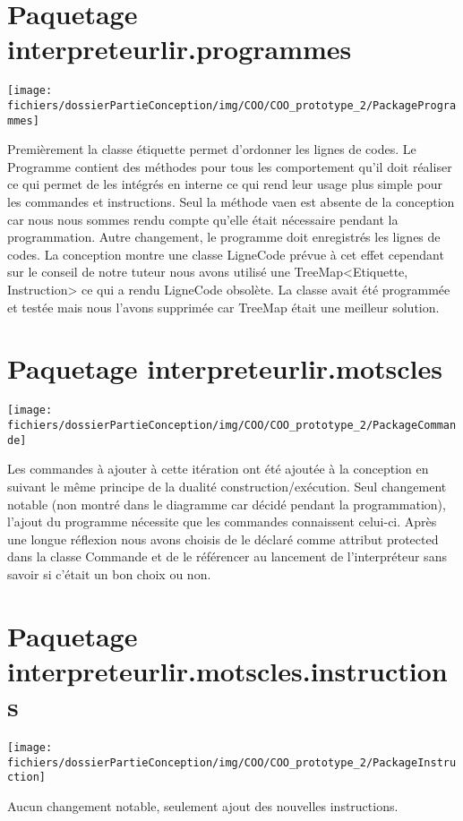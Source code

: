 \section{Paquetage interpreteurlir.programmes}
\begin{center}\texttt{[image: fichiers/dossierPartieConception/img/COO/COO\_prototype\_2/PackageProgrammes]}\end{center}
\par Premièrement la classe étiquette permet d'ordonner les lignes de codes. Le Programme contient des méthodes pour tous les comportement qu'il doit réaliser ce qui permet de les intégrés en interne ce qui rend leur usage plus simple pour les commandes et instructions. Seul la méthode vaen est absente de la conception car nous nous sommes rendu compte qu'elle était nécessaire pendant la programmation. Autre changement, le programme doit enregistrés les lignes de codes. La conception montre une classe LigneCode prévue à cet effet cependant sur le conseil de notre tuteur nous avons utilisé une TreeMap<Etiquette, Instruction> ce qui a rendu LigneCode obsolète. La classe avait été programmée et testée mais nous l'avons supprimée car TreeMap était une meilleur solution.

\section{Paquetage interpreteurlir.motscles}
\begin{center}\texttt{[image: fichiers/dossierPartieConception/img/COO/COO\_prototype\_2/PackageCommande]}\end{center}
\par Les commandes à ajouter à cette itération ont été ajoutée à la conception en suivant le même principe de la dualité construction/exécution. Seul changement notable (non montré dans le diagramme car décidé pendant la programmation), l'ajout du programme nécessite que les commandes connaissent celui-ci. Après une longue réflexion nous avons choisis de le déclaré comme attribut protected dans la classe Commande et de le référencer au lancement de l'interpréteur sans savoir si c'était un bon choix ou non.

\section{Paquetage interpreteurlir.motscles.instructions}
\begin{center}\texttt{[image: fichiers/dossierPartieConception/img/COO/COO\_prototype\_2/PackageInstruction]}\end{center}
\par Aucun changement notable, seulement ajout des nouvelles instructions.

